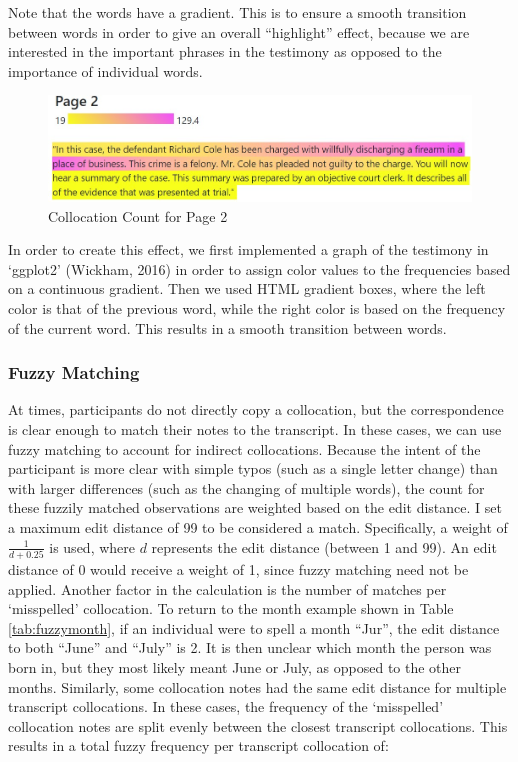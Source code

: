 \documentclass[print]{nuthesis}
\begin{document}
Note that the words have a gradient.
This is to ensure a smooth transition between words in order to give an overall ``highlight'' effect, because we are interested in the important phrases in the testimony as opposed to the importance of individual words.

\begin{figure}

{\centering \includegraphics[width=\linewidth]{images/collocationanalysis} 

}

\caption{Collocation Count for Page 2}\label{fig:highlights}
\end{figure}

In order to create this effect, we first implemented a graph of the testimony in `ggplot2' (Wickham, 2016) in order to assign color values to the frequencies based on a continuous gradient.
Then we used HTML gradient boxes, where the left color is that of the previous word, while the right color is based on the frequency of the current word.
This results in a smooth transition between words.

\hypertarget{fuzzy-matching}{%
\subsubsection{Fuzzy Matching}\label{fuzzy-matching}}

At times, participants do not directly copy a collocation, but the correspondence is clear enough to match their notes to the transcript.
In these cases, we can use fuzzy matching to account for indirect collocations.
Because the intent of the participant is more clear with simple typos (such as a single letter change) than with larger differences (such as the changing of multiple words), the count for these fuzzily matched observations are weighted based on the edit distance.
I set a maximum edit distance of 99 to be considered a match.
Specifically, a weight of \(\frac{1}{d+0.25}\) is used, where \(d\) represents the edit distance (between 1 and 99).
An edit distance of 0 would receive a weight of 1, since fuzzy matching need not be applied.
Another factor in the calculation is the number of matches per `misspelled' collocation.
To return to the month example shown in Table \ref{tab:fuzzymonth}, if an individual were to spell a month ``Jur'', the edit distance to both ``June'' and ``July'' is 2.
It is then unclear which month the person was born in, but they most likely meant June or July, as opposed to the other months.
Similarly, some collocation notes had the same edit distance for multiple transcript collocations.
In these cases, the frequency of the `misspelled' collocation notes are split evenly between the closest transcript collocations.
This results in a total fuzzy frequency per transcript collocation of:
\end{document}
